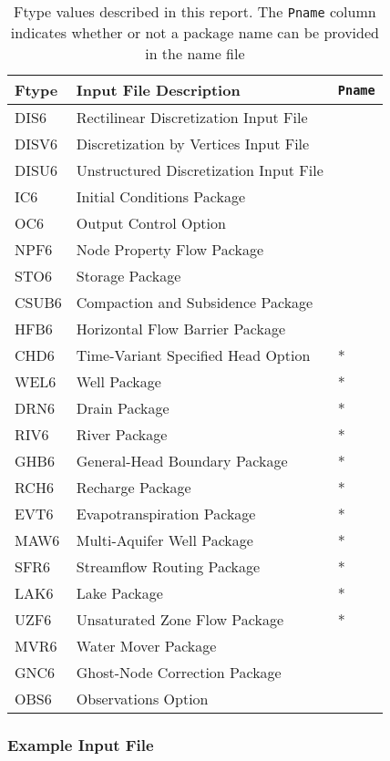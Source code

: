 \begin{table}[H]
\caption{Ftype values described in this report.  The \texttt{Pname} column indicates whether or not a package name can be provided in the name file}
\small
\begin{center}
\begin{tabular*}{\columnwidth}{l l l}
\hline
\hline
Ftype & Input File Description & \texttt{Pname}\\
\hline
DIS6 & Rectilinear Discretization Input File \\
DISV6 & Discretization by Vertices Input File \\
DISU6 & Unstructured Discretization Input File \\
IC6 & Initial Conditions Package \\
OC6 & Output Control Option \\
NPF6 & Node Property Flow Package \\ 
STO6 & Storage Package \\
CSUB6 & Compaction and Subsidence Package \\
HFB6 & Horizontal Flow Barrier Package\\
CHD6 & Time-Variant Specified Head Option & * \\
WEL6 & Well Package & * \\
DRN6 & Drain Package & * \\
RIV6 & River Package & * \\
GHB6 & General-Head Boundary Package & * \\
RCH6 & Recharge Package & * \\
EVT6 & Evapotranspiration Package & * \\
MAW6 & Multi-Aquifer Well Package & * \\
SFR6 & Streamflow Routing Package & * \\
LAK6 & Lake Package & * \\
UZF6 & Unsaturated Zone Flow Package & * \\
MVR6 & Water Mover Package \\
GNC6 & Ghost-Node Correction Package \\
OBS6 & Observations Option \\
\hline 
\end{tabular*}
\label{table:ftype}
\end{center}
\normalsize
\end{table}

\vspace{5mm}
\subsubsection{Example Input File}


